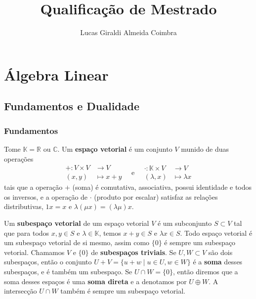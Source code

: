 \documentclass{article}
\title{Qualificação de Mestrado}
\author{Lucas Giraldi Almeida Coimbra}
\begin{document}
\maketitle
\tableofcontents

\section{Álgebra Linear}

\subsection{Fundamentos e Dualidade}

\subsubsection*{Fundamentos}

Tome $\mathbb{K} = \mathbb{R}$ ou $\mathbb{C}$. Um \textbf{espaço vetorial} é um conjunto $V$ munido de duas operações \begin{equation}
    \begin{split}
        + \colon V \times V &\to V \\ (x,y) &\mapsto x + y
    \end{split} \quad \text{e} \quad \begin{split}
        \cdot \colon \mathbb{K} \times V &\to V \\ (\lambda,x) &\mapsto \lambda x
    \end{split}
\end{equation} tais que a operação $+$ (soma) é comutativa, associativa, possui identidade e todos os inversos, e a operação de $\cdot$ (produto por escalar) satisfaz as relações distributivas, $1x = x$ e $\lambda(\mu x) = (\lambda\mu)x$.

Um \textbf{subespaço vetorial} de um espaço vetorial $V$ é um subconjunto $S \subset V$ tal que para todos $x, y \in S$ e $\lambda \in \mathbb{K}$, temos $x + y \in S$ e $\lambda x \in S$. Todo espaço vetorial é um subespaço vetorial de si mesmo, assim como $\{0\}$ é sempre um subespaço vetorial. Chamamos $V$ e $\{0\}$ de \textbf{subespaços triviais}. Se $U, W \subset V$ são dois subespaços, então o conjunto $U + V = \{u + w \mid u \in U, w \in W\}$ é a \textbf{soma} desses subespaços, e é também um subespaço. Se $U \cap W = \{0\}$, então diremos que a soma desses espaços é uma \textbf{soma direta} e a denotamos por $U \oplus W$. A intersecção $U \cap W$ também é sempre um subespaço vetorial.
\end{document}
